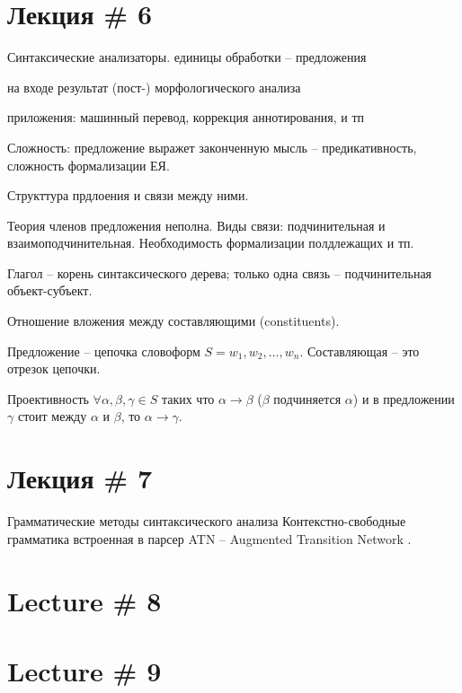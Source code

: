 \documentclass[a4paper]{article}
\newcommand{\eng}[1]{\foreignlanguage{english}{#1}}
\begin{document}
\section{Лекция \# 6} %
\label{sec:lecture_6}

Синтаксические анализаторы. единицы обработки -- предложения

на входе результат (пост-) морфологического анализа

приложения: машинный перевод, коррекция аннотирования, и тп

Сложность: предложение выражет законченную мысль -- предикативность, сложность формализации ЕЯ.

Структтура прдлоения и связи между ними.

Теория членов предложения неполна.
Виды связи: подчинительная и взаимоподчинительная. Необходимость формализации полдлежащих и тп.

Глагол -- корень синтаксического дерева; только одна связь -- подчинительная объект-субъект.

Отношение вложения между составляющими (\eng{constituents}).

Предложение -- цепочка словоформ $S = w_1, w_2, \ldots, w_n$. Составляющая -- это отрезок цепочки.

Проективность $\forall \alpha, \beta, \gamma \in S$ таких что $\alpha\to \beta$ ($\beta$ подчиняется $\alpha$) и в предложении $\gamma$ стоит между $\alpha$ и $\beta$, то $\alpha\to\gamma$.



\section{Лекция \# 7} %
\label{sec:lecture_7}

Грамматические методы синтаксического анализа
Контекстно-свободные грамматика встроенная в парсер
\eng{ATN} -- \eng{Augmented Transition Network}
.


\section{Lecture \# 8} %
\label{sec:lecture_8}


\section{Lecture \# 9} %
\label{sec:lecture_9}
\end{document}
